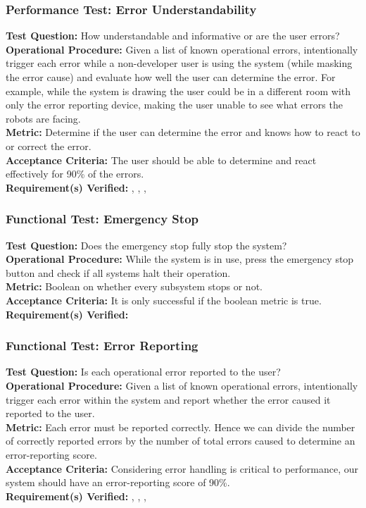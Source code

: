 \subsubsection{Performance Test: Error Understandability}
\label{test:ui_pt_error_understand}
\textbf{Test Question:} How understandable and informative or are the user errors?\\
\textbf{Operational Procedure:} Given a list of known operational errors, intentionally trigger each error while a non-developer user is using the system (while masking the error cause) and evaluate how well the user can determine the error. For example, while the system is drawing the user could be in a different room with only the error reporting device, making the user unable to see what errors the robots are facing.\\
\textbf{Metric:}  Determine if the user can determine the error and knows how to react to or correct the error. \\
\textbf{Acceptance Criteria:}  The user should be able to determine and react effectively for 90\% of the errors.\\
\textbf{Requirement(s) Verified:} , , , 

\subsubsection{Functional Test: Emergency Stop}
\label{test:ui_ft_emergency_stop}
\textbf{Test Question:} Does the emergency stop fully stop the system? \\
\textbf{Operational Procedure:} While the system is in use, press the emergency stop button and check if all systems halt their operation. \\
\textbf{Metric:} Boolean on whether every subsystem stops or not. \\
\textbf{Acceptance Criteria:} It is only successful if the boolean metric is true. \\
\textbf{Requirement(s) Verified:}  

\subsubsection{Functional Test: Error Reporting}
\label{test:ui_ft_error_reporting}
\textbf{Test Question:} Is each operational error reported to the user? \\
\textbf{Operational Procedure:} Given a list of known operational errors, intentionally trigger each error within the system and report whether the error caused it reported to the user. \\
\textbf{Metric:} Each error must be reported correctly. Hence we can divide the number of correctly reported errors by the number of total errors caused to determine an error-reporting score.  \\
\textbf{Acceptance Criteria:} Considering error handling is critical to performance, our system should have an error-reporting score of 90\%. \\
\textbf{Requirement(s) Verified:} , , , 

